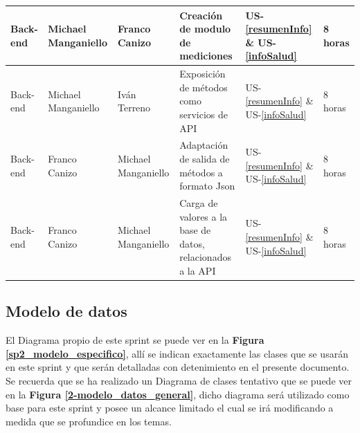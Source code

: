 {\begin{center}
{\begin{tabular}{|l|l|l|p{5cm}|l|p{1cm}|}
					Back-end & Michael Manganiello & Franco Canizo & Creación de modulo de mediciones&US-\ref{resumenInfo} \& US-\ref{infoSalud} & 8 horas \\ \hline
					Back-end & Michael Manganiello & Iván Terreno & Exposición de métodos como servicios de API 	& US-\ref{resumenInfo} \& US-\ref{infoSalud} & 8 horas \\ \hline
					Back-end & Franco Canizo & Michael Manganiello   & Adaptación de salida de métodos a formato Json&US-\ref{resumenInfo} \& US-\ref{infoSalud} & 8 horas \\ \hline
					Back-end & Franco Canizo & Michael Manganiello  & Carga de valores a la base de datos, relacionados a la API&US-\ref{resumenInfo} \& US-\ref{infoSalud} & 8 horas \\ \hline
				\end{tabular}
			}
		\end{center}
	}

\subsection{Modelo de datos}
El Diagrama propio de este sprint se puede ver en la \textbf{Figura \ref{sp2_modelo_especifico}}, allí se indican exactamente las clases que se usarán en este sprint y que serán detalladas con detenimiento en el presente documento. Se recuerda que se ha realizado un Diagrama de clases tentativo que se puede ver en la \textbf{Figura \ref{2-modelo_datos_general}}, dicho diagrama  será utilizado como base para este sprint y posee un alcance limitado el cual se irá modificando a medida que se profundice en los temas.




